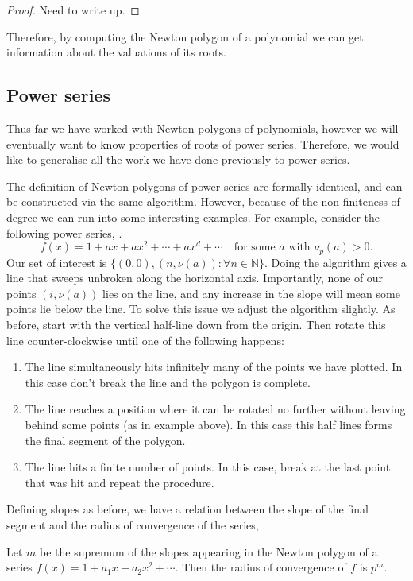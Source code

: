 \begin{proof}
  Need to write up.
\end{proof}

Therefore, by computing the Newton polygon of a polynomial we can get information about the
valuations of its roots.

\subsection{Power series}

Thus far we have worked with Newton polygons of polynomials, however we will eventually want to
know properties of roots of power series. Therefore, we would like to generalise all the work we
have done previously to power series.

The definition of Newton polygons of power series are formally identical, and can be constructed
via the same algorithm. However, because of the non-finiteness of degree we can run into some
interesting examples.
For example, consider the following power series, \cite[Page~260]{Gouvea}.
\[
f(x) = 1 + a x + ax^2 + \cdots +a x^d +\cdots \quad \text{for some } a \text{ with } \nu_p(a) > 0.
\]
Our set of interest is $\{(0,0),(n,\nu (a))  : \forall n \in \mathbb{N} \}.$ Doing the algorithm
gives a line that sweeps unbroken along the horizontal axis. Importantly, none of our points
$(i, \nu (a))$ lies on the line, and any increase in the slope will mean some points lie below the
line.
To solve this issue we adjust the algorithm slightly. As before, start with the vertical half-line
down from the origin. Then rotate this line counter-clockwise until one of the following happens:
\begin{enumerate}
    \item The line simultaneously hits infinitely many of the points we have plotted.
    In this case don't break the line and the polygon is complete.
    \item The line reaches a position where it can be rotated no further without leaving behind some
    points (as in example above). In this case this half lines forms the final segment of the
    polygon.
    \item The line hits a finite number of points. In this case, break at the last point that was
    hit and repeat the procedure.
\end{enumerate}

Defining slopes as before, we have a relation between the slope of the final segment and the
radius of convergence of the series, \cite[Lemma~7.4.8]{Gouvea}.
\begin{thm} \label{RadofCon}
    Let $m$ be the supremum of the slopes appearing in the Newton polygon of a series
    $f(x) = 1 + a_1 x + a_2 x^2 + \cdots$. Then the radius of convergence of $f$ is $p^m.$
\end{thm}

